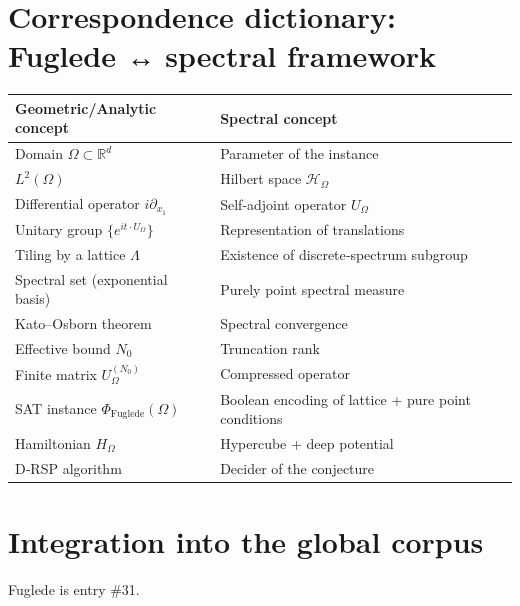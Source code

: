 \documentclass[11pt,a4paper]{article}
\begin{document}
\section{Correspondence dictionary: Fuglede ↔ spectral framework}

\begin{center}
\small
\begin{tabular}{@{}l|l@{}}
\toprule
\textbf{Geometric/Analytic concept} & \textbf{Spectral concept} \\
\midrule
Domain $\Omega \subset \mathbb{R}^d$ & Parameter of the instance \\
$L^2(\Omega)$ & Hilbert space $\mathcal{H}_\Omega$ \\
Differential operator $i\partial_{x_1}$ & Self‑adjoint operator $U_\Omega$ \\
Unitary group $\{e^{i t \cdot U_\Omega}\}$ & Representation of translations \\
Tiling by a lattice $\Lambda$ & Existence of discrete‑spectrum subgroup \\
Spectral set (exponential basis) & Purely point spectral measure \\
Kato–Osborn theorem & Spectral convergence \\
Effective bound $N_0$ & Truncation rank \\
Finite matrix $U_\Omega^{(N_0)}$ & Compressed operator \\
SAT instance $\Phi_{\text{Fuglede}}(\Omega)$ & Boolean encoding of lattice + pure point conditions \\
Hamiltonian $H_\Omega$ & Hypercube + deep potential \\
D‑RSP algorithm & Decider of the conjecture \\
\bottomrule
\end{tabular}
\end{center}

\section{Integration into the global corpus}

Fuglede is entry \#31.
\end{document}
